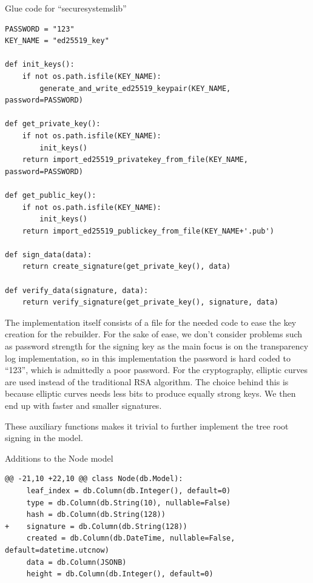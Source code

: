 \documentclass[../Main/thesis.tex]{subfiles}
\begin{document}
\begin{listing}[H]
\caption{Glue code for ``securesystemslib''}
\label{lst:securesystemslib_glue}
\begin{verbatim}
PASSWORD = "123"
KEY_NAME = "ed25519_key"

def init_keys():
    if not os.path.isfile(KEY_NAME):
        generate_and_write_ed25519_keypair(KEY_NAME, password=PASSWORD)

def get_private_key():
    if not os.path.isfile(KEY_NAME):
        init_keys()
    return import_ed25519_privatekey_from_file(KEY_NAME, password=PASSWORD)

def get_public_key():
    if not os.path.isfile(KEY_NAME):
        init_keys()
    return import_ed25519_publickey_from_file(KEY_NAME+'.pub')

def sign_data(data):
    return create_signature(get_private_key(), data)

def verify_data(signature, data):
    return verify_signature(get_private_key(), signature, data)
\end{verbatim}
\end{listing}

The implementation itself consists of a file for the needed code to ease the key
creation for the rebuilder. For the sake of ease, we don't consider problems
such as password strength for the signing key as the main focus is on the
transparency log implementation, so in this implementation the password is
hard coded to ``123'', which is admittedly a poor password. For the
cryptography, elliptic curves are used instead of the traditional RSA algorithm.
The choice behind this is because elliptic curves needs less bits to produce
equally strong keys. We then end up with faster and smaller signatures.

These auxiliary functions makes it trivial to further implement the tree root
signing in the model.

\begin{listing}[H]
\caption{Additions to the Node model}
\label{lst:node_tree_root_signature}
\begin{verbatim}
@@ -21,10 +22,10 @@ class Node(db.Model):
     leaf_index = db.Column(db.Integer(), default=0)
     type = db.Column(db.String(10), nullable=False)
     hash = db.Column(db.String(128))
+    signature = db.Column(db.String(128))
     created = db.Column(db.DateTime, nullable=False, default=datetime.utcnow)
     data = db.Column(JSONB)
     height = db.Column(db.Integer(), default=0)
\end{verbatim}
\end{listing}
\end{document}
